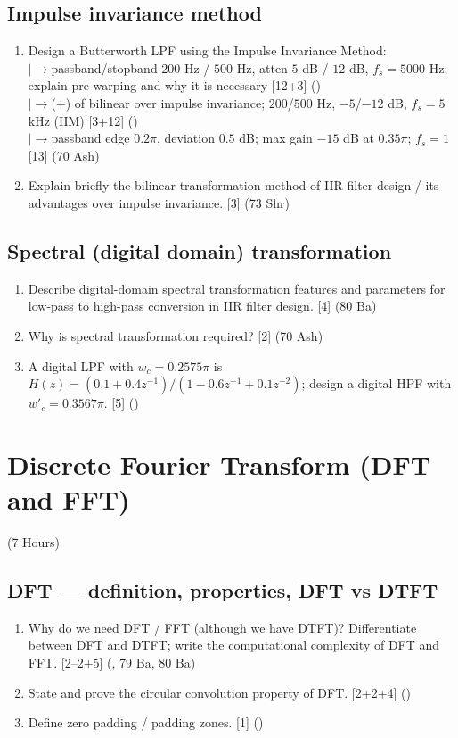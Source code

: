 \documentclass[12pt]{article}
\newcommand{\lb}{\\$\left|\rightarrow\right.$}
\begin{document}
  \subsection{Impulse invariance method}
    \begin{enumerate}[topsep=0pt, noitemsep]
      \item Design a Butterworth LPF using the Impulse Invariance Method:
        \lb passband/stopband $200$ Hz / $500$ Hz, atten $5$ dB / $12$ dB, $f_s=5000$ Hz; explain pre-warping and why it is necessary \hfill [12+3] ()
        \lb (+) of bilinear over impulse invariance; $200$/$500$ Hz, $-5$/$-12$ dB, $f_s=5$ kHz (IIM) \hfill [3+12] ()
        \lb passband edge $0.2\pi$, deviation $0.5$ dB; max gain $-15$ dB at $0.35\pi$; $f_s=1$ \hfill [13] (70 Ash)
      \item Explain briefly the bilinear transformation method of IIR filter design / its advantages over impulse invariance. \hfill [3] (73 Shr)
    \end{enumerate}

  \subsection{Spectral (digital domain) transformation}
    \begin{enumerate}[topsep=0pt, noitemsep]
      \item Describe digital-domain spectral transformation features and parameters for low-pass to high-pass conversion in IIR filter design. \hfill [4] (80 Ba)
      \item Why is spectral transformation required? \hfill [2] (70 Ash)
      \item A digital LPF with $w_c=0.2575\pi$ is $H(z)=(0.1+0.4z^{-1})/(1-0.6z^{-1}+0.1z^{-2})$; design a digital HPF with $w'_c=0.3567\pi$. \hfill [5] ()
    \end{enumerate}

\pagebreak
\section{Discrete Fourier Transform (DFT and FFT)}
\begin{center}(7 Hours)\end{center}

  \subsection{DFT --- definition, properties, DFT vs DTFT}
    \begin{enumerate}[topsep=0pt, noitemsep]
      \item Why do we need DFT / FFT (although we have DTFT)? Differentiate between DFT and DTFT; write the computational complexity of DFT and FFT. \hfill [2--2+5] (, 79 Ba, 80 Ba)
      \item State and prove the circular convolution property of DFT. \hfill [2+2+4] ()
      \item Define zero padding / padding zones. \hfill [1] ()
    \end{enumerate}
\end{document}
